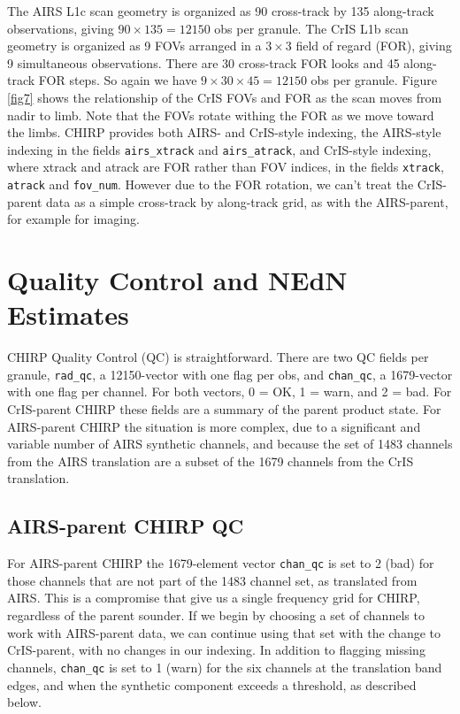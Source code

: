 \documentclass[11pt]{article}
\begin{document}
The AIRS L1c scan geometry is organized as 90 cross-track by 135
along-track observations, giving $90 \times 135 = 12150$ obs per
granule.  The CrIS L1b scan geometry is organized as 9 FOVs arranged
in a $3 \times 3$ field of regard (FOR), giving 9 simultaneous
observations.  There are 30 cross-track FOR looks and 45 along-track
FOR steps.  So again we have $9 \times 30 \times 45 = 12150$ obs per
granule.  Figure \ref{fig7} shows the relationship of the CrIS FOVs
and FOR as the scan moves from nadir to limb.  Note that the FOVs
rotate withing the FOR as we move toward the limbs.  CHIRP provides
both AIRS- and CrIS-style indexing, the AIRS-style indexing in the
fields \texttt{airs\_xtrack} and \texttt{airs\_atrack}, and
CrIS-style indexing, where xtrack and atrack are FOR rather than FOV
indices, in the fields \texttt{xtrack}, \texttt{atrack} and
\texttt{fov\_num}.  However due to the FOR rotation, we can't treat
the CrIS-parent data as a simple cross-track by along-track grid, as
with the AIRS-parent, for example for imaging.


\section{Quality Control and NEdN Estimates}
\label{qcnedn}

CHIRP Quality Control (QC) is straightforward.  There are two QC
fields per granule, \texttt{rad\_qc}, a 12150-vector with one flag
per obs, and \texttt{chan\_qc}, a 1679-vector with one flag per
channel.  For both vectors, 0 = OK, 1 = warn, and 2 = bad.  For
CrIS-parent CHIRP these fields are a summary of the parent product
state.  For AIRS-parent CHIRP the situation is more complex, due to
a significant and variable number of AIRS synthetic channels, and
because the set of 1483 channels from the AIRS translation are a
subset of the 1679 channels from the CrIS translation.

\subsection{AIRS-parent CHIRP QC}

For AIRS-parent CHIRP the 1679-element vector \texttt{chan\_qc} is
set to 2 (bad) for those channels that are not part of the 1483
channel set, as translated from AIRS.  This is a compromise that
give us a single frequency grid for CHIRP, regardless of the parent
sounder.  If we begin by choosing a set of channels to work with
AIRS-parent data, we can continue using that set with the change to
CrIS-parent, with no changes in our indexing.  In addition to
flagging missing channels, \texttt{chan\_qc} is set to 1 (warn) for
the six channels at the translation band edges, and when the
synthetic component exceeds a threshold, as described below.
\end{document}
